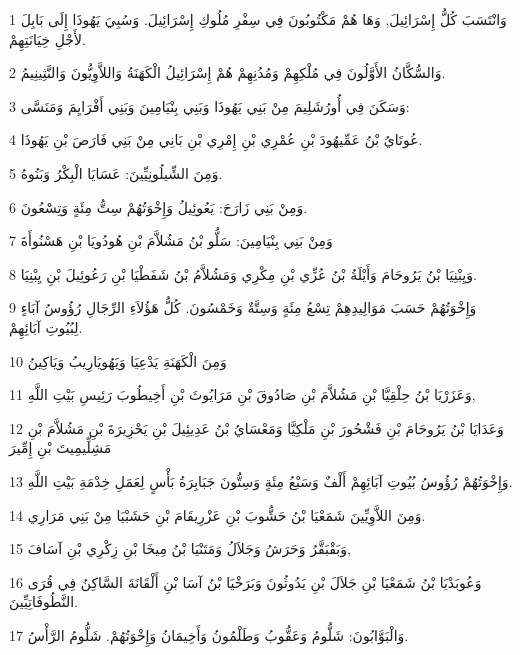 \par 1 وَانْتَسَبَ كُلُّ إِسْرَائِيلَ, وَهَا هُمْ مَكْتُوبُونَ فِي سِفْرِ مُلُوكِ إِسْرَائِيلَ. وَسُبِيَ يَهُوذَا إِلَى بَابِلَ لأَجْلِ خِيَانَتِهِمْ.
\par 2 وَالسُّكَّانُ الأَوَّلُونَ فِي مُلْكِهِمْ وَمُدُنِهِمْ هُمْ إِسْرَائِيلُ الْكَهَنَةُ وَاللاَّوِيُّونَ وَالنَّثِينِيمُ.
\par 3 وَسَكَنَ فِي أُورُشَلِيمَ مِنْ بَنِي يَهُوذَا وَبَنِي بِنْيَامِينَ وَبَنِي أَفْرَايِمَ وَمَنَسَّى:
\par 4 عُوتَايُ بْنُ عَمِّيهُودَ بْنِ عُمْرِي بْنِ إِمْرِي بْنِ بَانِي مِنْ بَنِي فَارَصَ بْنِ يَهُوذَا.
\par 5 وَمِنَ الشِّيلُونِيِّينَ: عَسَايَا الْبِكْرُ وَبَنُوهُ.
\par 6 وَمِنْ بَنِي زَارَحَ: يَعُوئِيلُ وَإِخْوَتُهُمْ سِتُّ مِئَةٍ وَتِسْعُونَ.
\par 7 وَمِنْ بَنِي بِنْيَامِينَ: سَلُّو بْنُ مَشُلاَّمَ بْنِ هُودُويَا بْنِ هَسْنُوأَةَ
\par 8 وَيِبْنِيَا بْنُ يَرُوحَامَ وَأَيْلَةُ بْنُ عُزِّي بْنِ مِكْرِي وَمَشُلاَّمُ بْنُ شَفَطْيَا بْنِ رَعُوئِيلَ بْنِ يِبْنِيَا.
\par 9 وَإِخْوَتُهُمْ حَسَبَ مَوَالِيدِهِمْ تِسْعُ مِئَةٍ وَسِتَّةٌ وَخَمْسُونَ. كُلُّ هَؤُلاَءِ الرِّجَالِ رُؤُوسُ آبَاءٍ لِبُيُوتِ آبَائِهِمْ.
\par 10 وَمِنَ الْكَهَنَةِ يَدْعِيَا وَيَهُويَارِيبُ وَيَاكِينُ
\par 11 وَعَزَرْيَا بْنُ حِلْقِيَّا بْنِ مَشُلاَّمَ بْنِ صَادُوقَ بْنِ مَرَايُوثَ بْنِ أَخِيطُوبَ رَئِيسِ بَيْتِ اللَّهِ,
\par 12 وَعَدَايَا بْنُ يَرُوحَامَ بْنِ فَشْحُورَ بْنِ مَلْكِيَّا وَمَعْسَايُ بْنُ عَدِيئِيلَ بْنِ يَحْزِيرَةَ بْنِ مَشُلاَّمَ بْنِ مَشِلِّيمِيتَ بْنِ إِمِّيرَ
\par 13 وَإِخْوَتُهُمْ رُؤُوسُ بُيُوتِ آبَائِهِمْ أَلْفٌ وَسَبْعُ مِئَةٍ وَسِتُّونَ جَبَابِرَةُ بَأْسٍ لِعَمَلِ خِدْمَةِ بَيْتِ اللَّهِ.
\par 14 وَمِنَ اللاَّوِيِّينَ شَمَعْيَا بْنُ حَشُّوبَ بْنِ عَزْرِيقَامَ بْنِ حَشَبْيَا مِنْ بَنِي مَرَارِي.
\par 15 وَبَقْبَقَّرُ وَحَرَشُ وَجَلاَلُ وَمَتَنْيَا بْنُ مِيخَا بْنِ زِكْرِي بْنِ آسَافَ,
\par 16 وَعُوبَدْيَا بْنُ شَمَعْيَا بْنِ جَلاَلَ بْنِ يَدُوثُونَ وَبَرَخْيَا بْنُ آسَا بْنِ أَلْقَانَةَ السَّاكِنُ فِي قُرَى النَّطُوفَاتِيِّينَ.
\par 17 وَالْبَوَّابُونَ: شَلُّومُ وَعَقُّوبُ وَطَلْمُونُ وَأَخِيمَانُ وَإِخْوَتُهُمْ. شَلُّومُ الرَّأْسُ.

